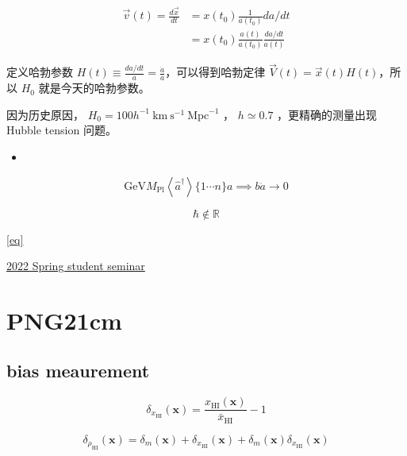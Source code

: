 \documentclass[]{ctexart}
\begin{document}
$$\begin{aligned} \vec{v}(t)=\frac{d \vec{x}}{d t} &=x\left(t_{0}\right) \frac{1}{a\left(t_{0}\right)} d a / d t \\ &=x\left(t_{0}\right) \frac{a(t)}{a\left(t_{0}\right)} \frac{d a / d t}{a(t)} \end{aligned}$$

定义哈勃参数 $H(t) \equiv \frac{da/dt}{a} = \frac{\dot{a}}{a}$，可以得到哈勃定律 $\vec{V}(t)=\vec{x}(t)H(t)$，所以 $H_0$ 就是今天的哈勃参数。


因为历史原因， $H_0 = 100 h^{-1} \mathrm{~km} \mathrm{~s}^{-1} \mathrm{~Mpc}^{-1}$ ， $h \simeq 0.7$ ，更精确的测量出现 Hubble tension 问题。

\begin{itemize}
    \item 
\end{itemize}

\begin{equation} \label{eq}
    \mathrm{GeV} M_{\mathrm{Pl}} \left\langle \hat{a}^{\dagger} \right\rangle \{1\cdots n\} a \implies b   \ddot{a} \to 0 
\end{equation}

\begin{equation*}
    \hbar \notin \mathbb{R} 
\end{equation*}

\ref{eq}

\href{http://astro.tsinghua.edu.cn/~wzhu/student-seminar-2022/index.html}{2022 Spring student seminar}



\section{PNG21cm}

\subsection{bias meaurement}

\begin{equation}
    \delta_{x_\mathrm{HI}}(\boldsymbol{x}) = \frac{x_\mathrm{HI}(\boldsymbol{x})}{\bar{x}_\mathrm{HI}} - 1
\end{equation}

\begin{equation}
    \delta_{\rho_{\mathrm{HI}}}(\boldsymbol{x}) = \delta_m(\boldsymbol{x}) + \delta_{x_\mathrm{HI}}(\boldsymbol{x}) + \delta_m(\boldsymbol{x}) \delta_{x_\mathrm{HI}}(\boldsymbol{x})
\end{equation}
\end{document}
